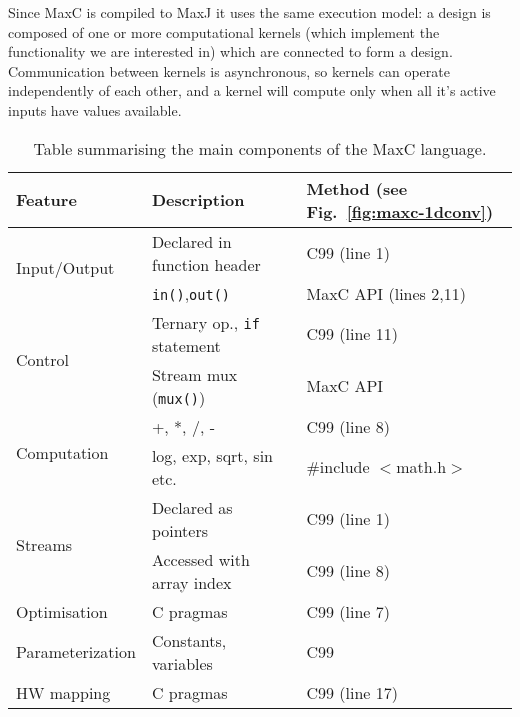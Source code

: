 Since MaxC is compiled to MaxJ it uses the same execution model: a
design is composed of one or more computational kernels (which
implement the functionality we are interested in) which are connected
to form a design. Communication between kernels is asynchronous, so
kernels can operate independently of each other, and a kernel will
compute only when all it's active inputs have values available.

\begin{table}[!h]
  \centering
\renewcommand{\arraystretch}{1.2}
\caption{Table summarising the main components of the MaxC language.}
\label{table:maxc-features}
\begin{tabular}{l|l|l}
\hline
\bf{Feature}                   & \bf{Description}                   & \bf{Method (see Fig.~\ref{fig:maxc-1dconv})} \\
\hline\hline
  \multirow{2}{*}{Input/Output}         & Declared in function header          & C99 (line 1)                                 \\\cline{2-3}       & \texttt{in()},\texttt{out()}  & MaxC API (lines 2,11) \\
\hline
  \multirow{2}{*}{Control}     & Ternary op., \texttt{if} statement & C99 (line 11)                                \\\cline{2-3}      & Stream mux (\texttt{mux()})       & MaxC API  \\
\hline
\multirow{2}{*}{Computation} & +, *, /, -                         & C99 (line 8)                           \\\cline{2-3} & log, exp, sqrt, sin etc.  & \#include $<$math.h$>$  \\
\hline
  \multirow{2}{*}{Streams}     & Declared as pointers               & C99 (line 1)                                 \\\cline{2-3}       & Accessed with array index & C99 (line 8) \\
\hline
  Optimisation                 & C pragmas                   & C99 (line 7)                                 \\
\hline
  Parameterization             & Constants, variables                   & C99                                          \\
\hline
HW mapping                  & C pragmas                   & C99 (line 17)                                \\
\end{tabular}
\end{table}

